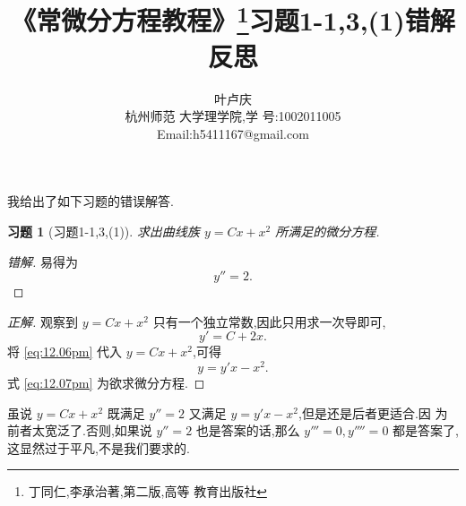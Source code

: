 \documentclass[twoside,11pt]{article}
\newtheorem*{cdtheorem}{习题}
\newenvironment{exercise}
{\begin{mdframed}[backgroundcolor=gray!40,rightline=false,leftline=false,topline=false,bottomline=false]\begin{cdtheorem}}
    {\end{cdtheorem}\end{mdframed}}
\begin{document}
  \title{{\bf {《常微分方程教程》\footnote{丁同仁,李承治著,第二版,高等
          教育出版社}习题1-1,3,(1)错解反思}}} \author{{叶卢庆} \\{{ \small{杭州师范
          大学理学院,学
          号:1002011005}}}\\\small{Email:h5411167@gmail.com}}
  \maketitle
我给出了如下习题的错误解答.\\
  \begin{exercise}[习题1-1,3,(1)]
求出曲线族 $y=Cx+x^2$ 所满足的微分方程.
  \end{exercise}
  \begin{proof}[错解]
易得为
\begin{equation}
  \label{eq:8.17pm}
  y''=2.
\end{equation}
\end{proof}

\begin{proof}[正解]
  观察到 $y=Cx+x^2$ 只有一个独立常数,因此只用求一次导即可,
  \begin{equation}
    \label{eq:12.06pm}
    y'=C+2x.
  \end{equation}
将 \eqref{eq:12.06pm} 代入 $y=Cx+x^2$,可得
\begin{equation}
  \label{eq:12.07pm}
  y=y'x-x^{2}.
\end{equation}
式 \eqref{eq:12.07pm} 为欲求微分方程.
\end{proof}

虽说 $y=Cx+x^2$ 既满足 $y''=2$ 又满足 $y=y'x-x^{2}$,但是还是后者更适合.因
为前者太宽泛了.否则,如果说 $y''=2$ 也是答案的话,那么 $y'''=0,y''''=0$
都是答案了,这显然过于平凡,不是我们要求的.
\end{document}
